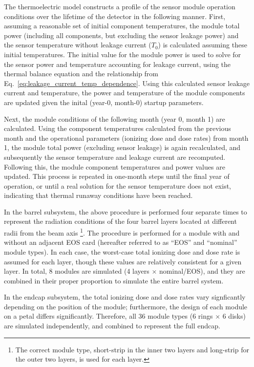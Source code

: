 
The thermoelectric model constructs a profile of the sensor module operation conditions over the
lifetime of the detector in the following manner. First, assuming a reasonable set of initial
component temperatures, the module total power (including all components, but excluding the sensor
leakage power) and the sensor temperature without leakage current ($T_0$) is calculated assuming these
initial temperatures.
The initial value for the module power is used to solve for the sensor power and temperature accounting
for leakage current, using the thermal balance equation and the relationship from
Eq.~\ref{eq:leakage_current_temp_dependence}.
Using this calculated sensor leakage current and temperature, the power and temperature of the module
components are updated given the inital (year-0, month-0) startup parameters.

Next, the module conditions of the following month (year 0, month 1) are calculated. Using the component
temperatures calculated from the previous month and the operational parameters (ionizing dose and dose
rates) from month 1, the module total power (excluding sensor leakage) is again recalculated, and
subsequently the sensor temperature and leakage current are recomputed. Following this,
the module component temperatures and power values are updated. This process is repeated in one-month
steps until the final year of operation, or until a real solution for the sensor temperature does not
exist, indicating that thermal runaway conditions have been reached.

In the barrel subsystem, the above procedure is performed four separate times to
represent the radiation conditions of the four barrel layers located at different radii from the beam axis
\footnote{
The correct module type, short-strip in the inner two layers and long-strip for the outer two
layers, is used for each layer.
}.
%
The procedure is performed for a module with and without an adjacent EOS card (hereafter referred to
as ``EOS'' and ``nominal'' module types).
In each case, the worst-case total ionizing dose and dose
rate is assumed for each layer, though these values are relatively consistent for a given layer.
In total, 8 modules are simulated (4 layers $\times$ nominal/EOS), and they are combined in their proper proportion to simulate the
entire barrel system.

In the endcap subsystem, the total ionizing dose and dose rates vary signficantly depending on the
position of the module; furthermore, the design of each module on a petal differs significantly.
Therefore, all 36 module types (6 rings $\times$ 6 disks) are simulated independently, and combined to
represent the full endcap.


